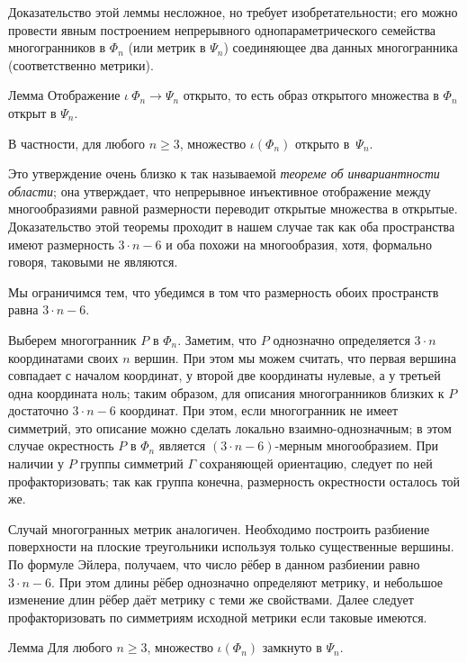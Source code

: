 \documentclass[oneside,a4paper]{article}
\begin{document}
Доказательство этой леммы несложное, но требует изобретательности; его можно провести явным построением непрерывного однопараметрического семейства многогранников в $\Phi_n$ (или метрик в $\Psi_n$) соединяющее два данных многогранника (соответственно метрики). 

\begin{thm}{Лемма}
Отображение $\iota\:\Phi_n\to\Psi_n$ открыто, 
то есть образ открытого множества в $\Phi_n$ открыт в $\Psi_n$.

В частности, для любого $n\ge 3$, множество $\iota(\Phi_n)$ открыто в~$\Psi_n$.
\end{thm}

Это утверждение очень близко к так называемой \emph{теореме об инвариантности области};
она утверждает, что непрерывное инъективное отображение между многообразиями равной размерности переводит открытые множества в открытые.
Доказательство этой теоремы проходит в нашем случае так как оба пространства имеют размерность $3\cdot n-6$ и оба похожи на многообразия, хотя, формально говоря, таковыми не являются.

Мы ограничимся тем, что убедимся в том что размерность обоих пространств равна $3\cdot n-6$.

Выберем многогранник $P$ в $\Phi_n$.
Заметим, что $P$ однозначно определяется $3\cdot n$ координатами своих $n$ вершин.
При этом мы можем считать, что первая вершина совпадает с началом координат, у второй две координаты нулевые, а у третьей одна координата ноль; таким образом, для описания многогранников близких к $P$ достаточно $3\cdot n-6$ координат.
При этом, если многогранник не имеет симметрий, это описание можно сделать локально взаимно-однозначным;
в этом случае окрестность $P$ в $\Phi_n$ является $(3\cdot n-6)$-мерным многообразием.
При наличии у $P$ группы симметрий $\Gamma$ сохраняющей ориентацию, следует по ней профакторизовать; так как группа конечна, размерность окрестности осталось той же.

Случай многогранных метрик аналогичен.
Необходимо построить разбиение поверхности на плоские треугольники используя только существенные вершины.
По формуле Эйлера, получаем, что число рёбер в данном разбиении равно $3\cdot n-6$.
При этом длины рёбер однозначно определяют метрику, и небольшое изменение длин рёбер даёт метрику с теми же свойствами.
Далее следует профакторизовать по симметриям исходной метрики если таковые имеются.

\begin{thm}{Лемма}
Для любого $n\ge 3$, множество $\iota(\Phi_n)$ замкнуто в $\Psi_n$.
\end{thm}
\end{document}
